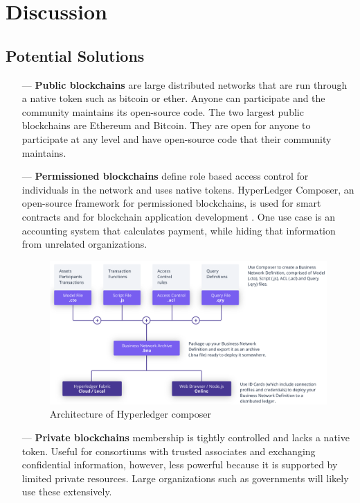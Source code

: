 	
\section{Discussion}

\subsection{Potential Solutions}

\begin{itemize}
	\item[---] \textbf{Public blockchains} are large distributed networks that are run through a native token such as bitcoin or ether. Anyone can participate and the community maintains its open-source code. The two largest public blockchains are Ethereum and Bitcoin. They are open for anyone to participate at any level and have open-source code that their community maintains.
	\item[---] \textbf{Permissioned blockchains} define role based access control for individuals in the network and uses native tokens.  HyperLedger Composer, an open-source framework for permissioned blockchains, is used for smart contracts and for blockchain application development \cite{hyperledgerComposer:Online}. One use case is an accounting system that calculates payment, while hiding that information from unrelated organizations.  \hfill \break %
	\begin{figure}[ht]
	\includegraphics[width=1\linewidth]{Diagrams/composer-arch.png}
	\caption{Architecture of Hyperledger composer}
	\end{figure}
	\item[---] \textbf{Private blockchains}  membership is tightly controlled and lacks a native token. Useful for consortiums with trusted associates and exchanging confidential information, however, less powerful because it is supported by limited private resources. Large organizations such as governments will likely use these extensively.
\end{itemize}

